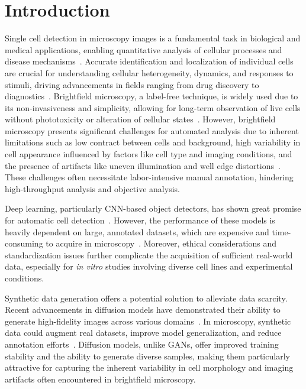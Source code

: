 \section{Introduction}
\label{sec:introduction}
Single cell detection in microscopy images is a fundamental task in biological and medical applications, enabling quantitative analysis of cellular processes and disease mechanisms~\cite{meijering_cell_2012}.
Accurate identification and localization of individual cells are crucial for understanding cellular heterogeneity, dynamics, and responses to stimuli, driving advancements in fields ranging from drug discovery to diagnostics~\cite{f_mualla_automatic_2016,e_d_ferreira_classification_2024}.
Brightfield microscopy, a label-free technique, is widely used due to its non-invasiveness and simplicity, allowing for long-term observation of live cells without phototoxicity or alteration of cellular states~\cite{jyrki_selinummi_bright_2009,huixia_ren_cellbow_2020}.
However, brightfield microscopy presents significant challenges for automated analysis due to inherent limitations such as low contract between cells and background, high variability in cell appearance influenced by factors like cell type and imaging conditions, and the presence of artifacts like uneven illumination and well edge distortions~\cite{jyrki_selinummi_bright_2009,f_mualla_automatic_2016}.
These challenges often necessitate labor-intensive manual annotation, hindering high-throughput analysis and objective analysis.

Deep learning, particularly CNN-based object detectors, has shown great promise for automatic cell detection~\cite{erick_moen_deep_2019,thorsten_falk_u-net_2019}.
However, the performance of these models is heavily dependent on large, annotated datasets, which are expensive and time-consuming to acquire in microscopy~\cite{ronneberger_u-net_2015}.
Moreover, ethical considerations and standardization issues further complicate the acquisition of sufficient real-world data, especially for \textit{in vitro} studies involving diverse cell lines and experimental conditions.

Synthetic data generation offers a potential solution to alleviate data scarcity.
Recent advancements in diffusion models have demonstrated their ability to generate high-fidelity images across various domains~\cite{ho_denoising_2020,song_denoising_2020}.
In microscopy, synthetic data could augment real datasets, improve model generalization, and reduce annotation efforts~\cite{rajaram_simucell_2012,trampert_deep_2021,lehmussola_synthetic_2008}.
Diffusion models, unlike GANs, offer improved training stability and the ability to generate diverse samples, making them particularly attractive for capturing the inherent variability in cell morphology and imaging artifacts often encountered in brightfield microscopy.

